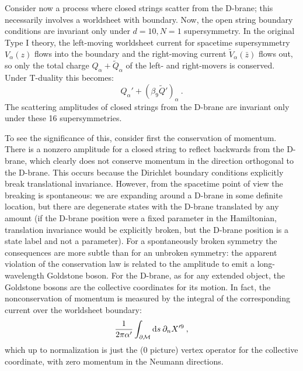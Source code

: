 Consider now a process where closed strings scatter from the D-brane; this necessarily involves a worldsheet with boundary. Now, the open string boundary conditions are invariant only under $d = 10, N = 1$ supersymmetry. In the original Type I theory, the left-moving worldsheet current for spacetime supersymmetry $V_\alpha(z)$ flows into the boundary and the right-moving current $\tilde{V}_\alpha(\bar{z})$ flows out, so only the total charge $Q_\alpha + \tilde{Q}_\alpha$ of the left- and right-movers is conserved. Under T-duality this becomes:
\begin{equation}
	Q_\alpha' + (\beta_9\tilde{Q}')_\alpha \:. \label{13.2.2}
\end{equation}
The scattering amplitudes of closed strings from the D-brane are invariant only under these 16 supersymmetries.

To see the significance of this, consider first the conservation of momentum. There is a nonzero amplitude for a closed string to reflect backwards from the D-brane, which clearly does not conserve momentum in the direction orthogonal to the D-brane. This occurs because the Dirichlet boundary conditions explicitly break translational invariance. However, from the spacetime point of view the breaking is spontaneous: we are expanding around a D-brane in some definite location, but there are degenerate states with the D-brane translated by any amount (if the D-brane position were a fixed parameter in the Hamiltonian, translation invariance would be explicitly broken, but the D-brane position is a state label and not a parameter). For a spontaneously broken symmetry the consequences are more subtle than for an unbroken symmetry: the apparent violation of the conservation law is related to the amplitude to emit a long-wavelength Goldstone boson. For the D-brane, as for any extended object, the Goldstone bosons are the collective coordinates for its motion. In fact, the nonconservation of momentum is measured by the integral of the corresponding current over the worldsheet boundary:
\begin{equation}
	\frac{1}{2\pi\alpha'}\int_{\partial\mathcal{M}}\mathrm{d} s\:\partial_n X'^9 \:, \label{13.2.3}
\end{equation}
which up to normalization is just the ($0$ picture) vertex operator for the collective coordinate, with zero momentum in the Neumann directions.

